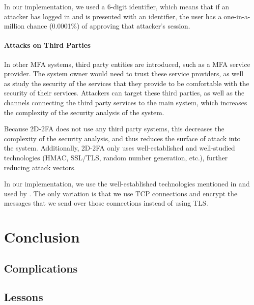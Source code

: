 \documentclass[11pt]{article} %
\begin{document}
In our implementation, we used a 6-digit identifier, which means that if
an attacker has logged in and is presented with an identifier, the user
has a one-in-a-million chance (0.0001\%) of approving that attacker's
session. 

\paragraph{Attacks on Third Parties}
In other MFA systems, third party entities are introduced, such as a MFA
service provider. The system owner would need to trust these service
providers, as well as study the security of the services that they
provide to be comfortable with the security of their services. Attackers
can target these third parties, as well as the channels connecting the
third party services to the main system, which increases the complexity
of the security analysis of the system. 

Because 2D-2FA does not use any third party systems, this decreases the
complexity of the security analysis, and thus reduces the surface of
attack into the system. Additionally, 2D-2FA only uses well-established
and well-studied technologies (HMAC, SSL/TLS, random number generation,
etc.), further reducing attack vectors.

In our implementation, we use the well-established technologies
mentioned in and used by \cite{shirvanian2d2fa}. The only variation is
that we use TCP connections and encrypt the messages
that we send over those connections instead of using TLS.

\section{Conclusion}



\subsection{Complications}



\subsection{Lessons}
\end{document}
